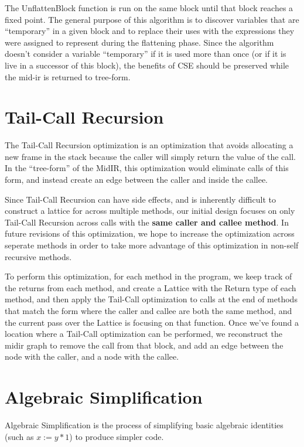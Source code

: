 \documentclass[11pt]{article}
\begin{document}
\noindent The UnflattenBlock function is run on the same block until that block
reaches a fixed point. The general purpose of this algorithm is to
discover variables that are ``temporary'' in a given block and to replace
their uses with the expressions they were assigned to represent during
the flattening phase. Since the algorithm doesn't consider a variable
``temporary'' if it is used more than once (or if it is live in a
successor of this block), the benefits of CSE should be preserved
while the mid-ir is returned to tree-form. 

\section {Tail-Call Recursion}
\label{sec:tailcall}

The Tail-Call Recursion optimization is an optimization that avoids
allocating a new frame in the stack because the caller will simply
return the value of the call. In the ``tree-form'' of the MidIR, this
optimization would eliminate calls of this form, and instead create an
edge between the caller and inside the callee.

Since Tail-Call Recursion can have side effects, and is inherently
difficult to construct a lattice for across multiple methods, our
initial design focuses on only Tail-Call Recursion across calls with
the \textbf{same caller and callee method}. In future revisions of
this optimization, we hope to increase the optimization across
seperate methods in order to take more advantage of this optimization
in non-self recursive methods.

To perform this optimization, for each method in the program, we keep
track of the returns from each method, and create a Lattice with the
Return type of each method, and then apply the Tail-Call optimization
to calls at the end of methods that match the form where the caller
and callee are both the same method, and the current pass over the
Lattice is focusing on that function. Once we've found a location
where a Tail-Call optimization can be performed, we reconstruct the
midir graph to remove the call from that block, and add an edge
between the node with the caller, and a node with the callee.


\section {Algebraic Simplification}
\label{sec:algebra}

Algebraic Simplification is the process of simplifying basic algebraic
identities (such as $x := y * 1$) to
produce simpler code. 
\end{document}
